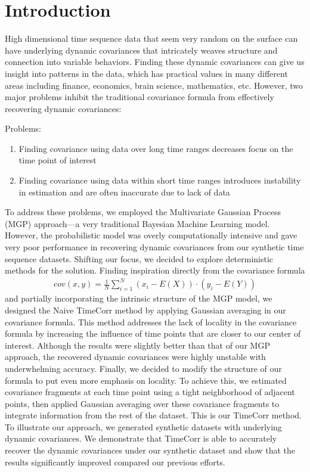 \documentclass[12pt]{article}
\begin{document}
\section{Introduction} \label{introduction}
High dimensional time sequence data that seem very random on the surface can have underlying dynamic covariances that intricately weaves structure and connection into variable behaviors. Finding these dynamic covariances can give us insight into patterns in the data, which has practical values in many different areas including finance, economics, brain science, mathematics, etc. However, two major problems inhibit the traditional covariance formula from effectively recovering dynamic covariances:\par
Problems:\par
\begin{enumerate}
\item Finding covariance using data over long time ranges decreases focus on the time point of interest
\item Finding covariance using data within short time ranges introduces instability in estimation and are often inaccurate due to lack of data
\end{enumerate}
To address these problems, we employed the Multivariate Gaussian Process (MGP) approach---a very traditional Bayesian Machine Learning model. However, the probabilistic model was overly computationally intensive and gave very poor performance in recovering dynamic covariances from our synthetic time sequence datasets. Shifting our focus, we decided to explore deterministic methods for the solution. Finding inspiration directly from the covariance formula
\begin{align}
cov(x,y) = \frac{1}{N}\sum_{i=1}^N (x_i - E(X))\cdot(y_i-E(Y))
\end{align}
and partially incorporating the intrinsic structure of the MGP model, we designed the Naive TimeCorr method by applying Gaussian averaging in our covariance formula. This method addresses the lack of locality in the covariance formula by increasing the influence of time points that are closer to our center of interest. Although the results were slightly better than that of our MGP approach, the recovered dynamic covariances were highly unstable with underwhelming accuracy. Finally, we decided to modify the structure of our formula to put even more emphasis on locality. To achieve this, we estimated covariance fragments at each time point using a tight neighborhood of adjacent points, then applied Gaussian averaging over these covariance fragments to integrate information from the rest of the dataset. This is our TimeCorr method. To illustrate our approach, we generated synthetic datasets with underlying dynamic covariances. We demonstrate that TimeCorr is able to accurately recover the dynamic covariances under our synthetic dataset and show that the results significantly improved compared our previous efforts.
\end{document}
